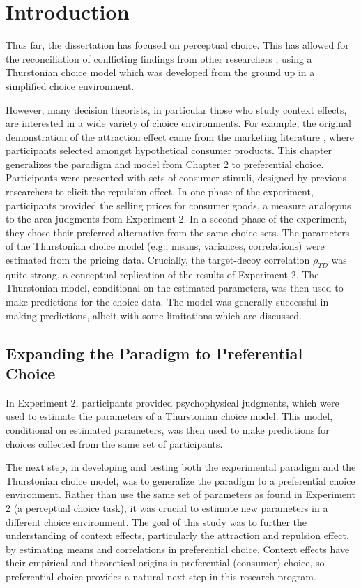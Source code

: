\section{Introduction}
Thus far, the dissertation has focused on perceptual choice. This has allowed for the reconciliation of conflicting findings from other researchers \parencite{spektorWhenGoodLooks2018b,trueblood2013not}, using a Thurstonian choice model which was developed from the ground up in a simplified choice environment.

However, many decision theorists, in particular those who study context effects, are interested in a wide variety of choice environments. For example, the original demonstration of the attraction effect came from the marketing literature \parencite{huberAddingAsymmetricallyDominated1982d}, where participants selected amongst hypothetical consumer products. This chapter generalizes the paradigm and model from Chapter 2 to preferential choice. Participants were presented with sets of consumer stimuli, designed by previous researchers to elicit the repulsion effect. In one phase of the experiment, participants provided the selling prices for consumer goods, a measure analogous to the area judgments from Experiment 2. In a second phase of the experiment, they chose their preferred alternative from the same choice sets. The parameters of the Thurstonian choice model (e.g., means, variances, correlations) were estimated from the pricing data. Crucially, the target-decoy correlation $\rho_{TD}$ was quite strong, a conceptual replication of the results of Experiment 2. The Thurstonian model, conditional on the estimated parameters, was then used to make predictions for the choice data. The model was generally successful in making predictions, albeit with some limitations which are discussed. 

\subsection{Expanding the Paradigm to Preferential Choice}

In Experiment 2, participants provided psychophysical judgments, which were used to estimate the parameters of a Thurstonian choice model. This model, conditional on estimated parameters, was then used to make predictions for choices collected from the same set of participants. 

The next step, in developing and testing both the experimental paradigm and the Thurstonian choice model, was to generalize the paradigm to a preferential choice environment. Rather than use the same set of parameters as found in Experiment 2 (a perceptual choice task), it was crucial to estimate new parameters in a different choice environment. The goal of this study was to further the understanding of context effects, particularly the attraction and repulsion effect, by estimating means and correlations in preferential choice. Context effects have their empirical and theoretical origins in preferential (consumer) choice, so preferential choice provides a natural next step in this research program.

